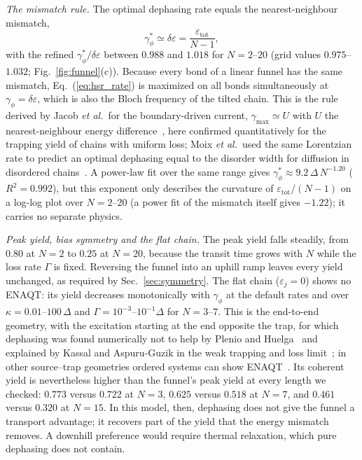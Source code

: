\documentclass[aps,pre,preprint,floatfix]{revtex4-2}
\newcommand{\gp}{\gamma_\phi}
\newcommand{\gps}{\gamma_\phi^*}
\newcommand{\dE}{\delta\varepsilon}
\begin{document}
\textit{The mismatch rule.}
The optimal dephasing rate equals the nearest-neighbour mismatch,
\begin{equation}
  \gps \simeq \dE = \frac{\varepsilon_\text{tot}}{N-1},
  \label{eq:mismatch_rule}
\end{equation}
with the refined $\gps/\dE$ between $0.988$ and $1.018$ for $N=2$--$20$
(grid values $0.975$--$1.032$; Fig.~\ref{fig:funnel}(c)).
Because every bond of a linear funnel has the same mismatch,
Eq.~(\ref{eq:hsr_rate}) is maximized on all bonds simultaneously at
$\gp=\dE$, which is also the Bloch frequency of the tilted chain.
This is the rule derived by Jacob \textit{et al.}\ for the boundary-driven
current, $\gamma_\text{max}\simeq U$ with $U$ the nearest-neighbour energy
difference~\cite{jacob2024}, here confirmed quantitatively for the trapping
yield of chains with uniform loss; Moix \textit{et al.}\ used the same
Lorentzian rate to predict an optimal dephasing equal to the disorder width
for diffusion in disordered chains~\cite{moix2013}.
A power-law fit over the same range gives $\gps\approx9.2\,\Delta\,N^{-1.20}$
($R^2=0.992$), but this exponent only describes the curvature of
$\varepsilon_\text{tot}/(N-1)$ on a log-log plot over $N=2$--$20$ (a power
fit of the mismatch itself gives $-1.22$); it carries no separate physics.

\textit{Peak yield, bias symmetry and the flat chain.}
The peak yield falls steadily, from $0.80$ at $N=2$ to $0.25$ at $N=20$,
because the transit time grows with $N$ while the loss rate $\Gamma$ is fixed.
Reversing the funnel into an uphill ramp leaves every yield unchanged, as
required by Sec.~\ref{sec:symmetry}.
The flat chain ($\varepsilon_j=0$) shows no ENAQT: its yield decreases
monotonically with $\gp$ at the default rates and over
$\kappa=0.01$--$100\,\Delta$ and $\Gamma=10^{-3}$--$10^{-1}\Delta$ for
$N=3$--$7$.
This is the end-to-end geometry, with the excitation starting at the end
opposite the trap, for which dephasing was found numerically not to help by
Plenio and Huelga~\cite{plenio2008} and explained by Kassal and
Aspuru-Guzik in the weak trapping and loss limit~\cite{kassal2012}; in other
source--trap geometries ordered systems can show ENAQT~\cite{kassal2012}.
Its coherent yield is nevertheless higher than the funnel's peak yield at
every length we checked: $0.773$ versus $0.722$ at $N=3$, $0.625$ versus
$0.518$ at $N=7$, and $0.461$ versus $0.320$ at $N=15$.
In this model, then, dephasing does not give the funnel a transport advantage;
it recovers part of the yield that the energy mismatch removes.
A downhill preference would require thermal relaxation, which pure dephasing
does not contain.
\end{document}
